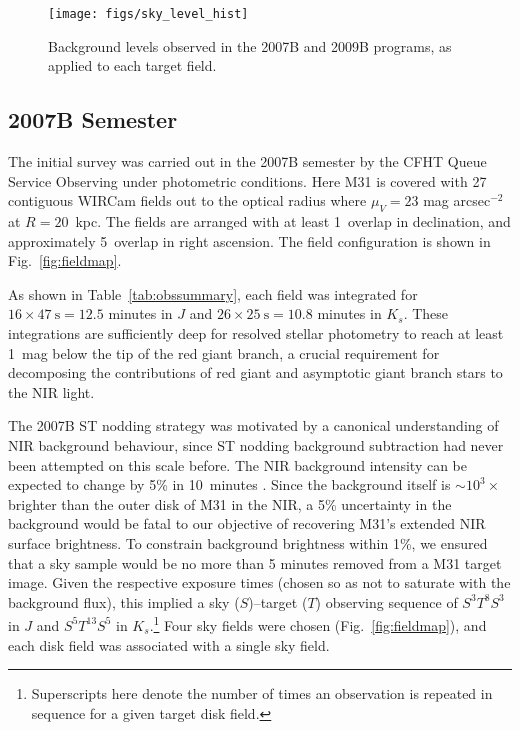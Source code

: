 \documentclass[iop]{emulateapj}
\newcommand{\Fig}[1]{Fig.~\ref{fig:#1}}  %
\begin{document}
\begin{figure}[t]
\centering
\texttt{[image: figs/sky\_level\_hist]}
\caption{Background levels observed in the 2007B and 2009B programs, as applied to each target field.}
\label{fig:net_sky_level}
\end{figure}

\subsection{2007B Semester}
\label{sec:obs7}

The initial survey was carried out in the 2007B semester by the CFHT Queue Service Observing under photometric conditions.
Here M31 is covered with 27 contiguous WIRCam fields out to the optical radius where $\mu_V=23$ mag arcsec$^{-2}$ at $R=20$~kpc.
The fields are arranged with at least 1\arcmin\ overlap in declination, and approximately 5\arcmin\ overlap in right ascension.
The field configuration is shown in \Fig{fieldmap}.

As shown in Table~\ref{tab:obssummary}, each field was integrated for $16\times 47~\mathrm{s} = 12.5$ minutes in $J$ and $26\times 25~\mathrm{s} = 10.8$ minutes in $K_s$.
These integrations are sufficiently deep for resolved stellar photometry to reach at least 1~mag below the tip of the red giant branch, a crucial requirement for decomposing the contributions of red giant and asymptotic giant branch stars to the NIR light.

The 2007B ST nodding strategy was motivated by a canonical understanding of NIR background behaviour, since ST nodding background subtraction had never been attempted on this scale before.
The NIR background intensity can be expected to change by 5\% in 10~minutes \citep{Adams:1996,Vaduvescu:2004}.
Since the background itself is $\sim10^3\times$ brighter than the outer disk of M31 in the NIR, a 5\% uncertainty in the background would be fatal to our objective of recovering M31's extended NIR surface brightness.
To constrain background brightness within 1\%, we ensured that a sky sample would be no more than 5 minutes removed from a M31 target image.
Given the respective exposure times (chosen so as not to saturate with the background flux), this implied a sky ($S$)--target ($T$) observing sequence of $S^3T^8S^3$ in $J$ and $S^5T^{13}S^5$ in $K_s$.\footnote{Superscripts here denote the number of times an observation is repeated in sequence for a given target disk field.}
Four sky fields were chosen (\Fig{fieldmap}), and each disk field was associated with a single sky field.
\end{document}
